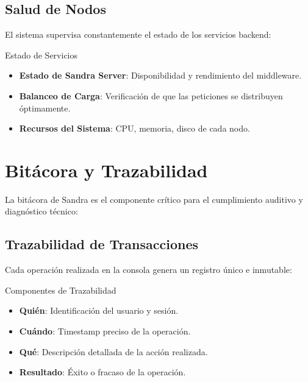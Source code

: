 \subsection{Salud de Nodos}

El sistema supervisa constantemente el estado de los servicios backend:

\begin{caja}{Estado de Servicios}
\begin{itemize}
\item \textbf{Estado de Sandra Server}: Disponibilidad y rendimiento del middleware.
\item \textbf{Balanceo de Carga}: Verificación de que las peticiones se distribuyen óptimamente.
\item \textbf{Recursos del Sistema}: CPU, memoria, disco de cada nodo.
\end{itemize}
\end{caja}


\section{Bitácora y Trazabilidad}

La bitácora de Sandra es el componente crítico para el cumplimiento auditivo y diagnóstico técnico:

\subsection{Trazabilidad de Transacciones}

Cada operación realizada en la consola genera un registro único e inmutable:

\begin{caja}{Componentes de Trazabilidad}
\begin{itemize}
\item \textbf{Quién}: Identificación del usuario y sesión.
\item \textbf{Cuándo}: Timestamp preciso de la operación.
\item \textbf{Qué}: Descripción detallada de la acción realizada.
\item \textbf{Resultado}: Éxito o fracaso de la operación.
\end{itemize}
\end{caja}

